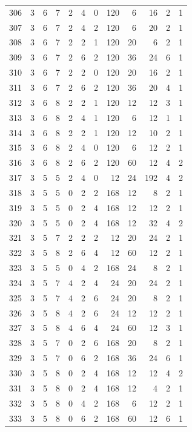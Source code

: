 \documentclass[11pt,a4paper]{article}
\begin{document}
\begin{longtable}{r|rrr|rrr|rrr|rr}
306 & 3 & 6 & 7 & 2 & 4 & 0 & 120 & 6 & 16 & 2 & 1\\
307 & 3 & 6 & 7 & 2 & 4 & 2 & 120 & 6 & 20 & 2 & 1\\
308 & 3 & 6 & 7 & 2 & 2 & 1 & 120 & 20 & 6 & 2 & 1\\
309 & 3 & 6 & 7 & 2 & 6 & 2 & 120 & 36 & 24 & 6 & 1\\
310 & 3 & 6 & 7 & 2 & 2 & 0 & 120 & 20 & 16 & 2 & 1\\
311 & 3 & 6 & 7 & 2 & 6 & 2 & 120 & 36 & 20 & 4 & 1\\
312 & 3 & 6 & 8 & 2 & 2 & 1 & 120 & 12 & 12 & 3 & 1\\
313 & 3 & 6 & 8 & 2 & 4 & 1 & 120 & 6 & 12 & 1 & 1\\
314 & 3 & 6 & 8 & 2 & 2 & 1 & 120 & 12 & 10 & 2 & 1\\
315 & 3 & 6 & 8 & 2 & 4 & 0 & 120 & 6 & 12 & 2 & 1\\
316 & 3 & 6 & 8 & 2 & 6 & 2 & 120 & 60 & 12 & 4 & 2\\
317 & 3 & 5 & 5 & 2 & 4 & 0 & 12 & 24 & 192 & 4 & 2\\
318 & 3 & 5 & 5 & 0 & 2 & 2 & 168 & 12 & 8 & 2 & 1\\
319 & 3 & 5 & 5 & 0 & 2 & 4 & 168 & 12 & 12 & 2 & 1\\
320 & 3 & 5 & 5 & 0 & 2 & 4 & 168 & 12 & 32 & 4 & 2\\
321 & 3 & 5 & 7 & 2 & 2 & 2 & 12 & 20 & 24 & 2 & 1\\
322 & 3 & 5 & 8 & 2 & 6 & 4 & 12 & 60 & 12 & 2 & 1\\
323 & 3 & 5 & 5 & 0 & 4 & 2 & 168 & 24 & 8 & 2 & 1\\
324 & 3 & 5 & 7 & 4 & 2 & 4 & 24 & 20 & 24 & 2 & 1\\
325 & 3 & 5 & 7 & 4 & 2 & 6 & 24 & 20 & 8 & 2 & 1\\
326 & 3 & 5 & 8 & 4 & 2 & 6 & 24 & 12 & 12 & 2 & 1\\
327 & 3 & 5 & 8 & 4 & 6 & 4 & 24 & 60 & 12 & 3 & 1\\
328 & 3 & 5 & 7 & 0 & 2 & 6 & 168 & 20 & 8 & 2 & 1\\
329 & 3 & 5 & 7 & 0 & 6 & 2 & 168 & 36 & 24 & 6 & 1\\
330 & 3 & 5 & 8 & 0 & 2 & 4 & 168 & 12 & 12 & 4 & 2\\
331 & 3 & 5 & 8 & 0 & 2 & 4 & 168 & 12 & 4 & 2 & 1\\
332 & 3 & 5 & 8 & 0 & 4 & 2 & 168 & 6 & 12 & 2 & 1\\
333 & 3 & 5 & 8 & 0 & 6 & 2 & 168 & 60 & 12 & 6 & 1\\

\end{longtable}
\end{document}
